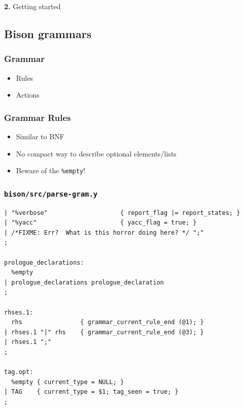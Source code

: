 \documentclass{beamer}
\begin{document}
\begingroup
{}
\begin{frame}
    \begin{center}
        \vspace{1cm}
        {\Huge\color{black} \textbf{2.} { Getting started}}
    \end{center}
\end{frame}
\endgroup

\subsection{Bison grammars}

\begin{frame}
  \frametitle{Grammar}
    \begin{itemize}
      \item Rules
      \item Actions
    \end{itemize}
\end{frame}

\begin{frame}
  \frametitle{Grammar Rules}
    \begin{itemize}
      \item Similar to BNF
      \item No compact way to describe optional elements/lists
      \item Beware of the \texttt{\%empty}!
    \end{itemize}
\end{frame}

\begin{frame}[fragile,shrink=25]
  \frametitle{\texttt{bison/src/parse-gram.y}}
\begin{verbatim}
| "%verbose"                    { report_flag |= report_states; }
| "%yacc"                       { yacc_flag = true; }
| /*FIXME: Err?  What is this horror doing here? */ ";"
;

prologue_declarations:
  %empty
| prologue_declarations prologue_declaration
;

rhses.1:
  rhs                { grammar_current_rule_end (@1); }
| rhses.1 "|" rhs    { grammar_current_rule_end (@3); }
| rhses.1 ";"
;

tag.opt:
  %empty { current_type = NULL; }
| TAG    { current_type = $1; tag_seen = true; }
;
\end{verbatim}
\end{frame}
\end{document}
